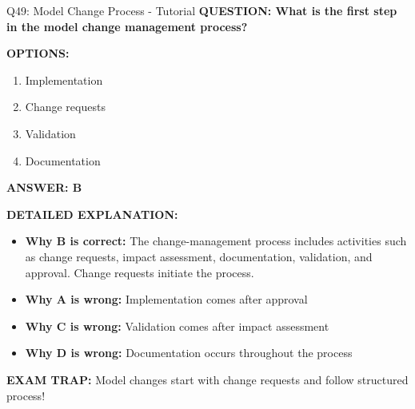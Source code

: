 \documentclass[8pt]{beamer}
\begin{document}
	\begin{frame}{Q49: Model Change Process - Tutorial}
		\fontsize{6.5}{7.5}\selectfont
		\textbf{QUESTION: What is the first step in the model change management process?}
		
		\vspace{0.1cm}
		\textbf{OPTIONS:}
		\begin{enumerate}
			\item Implementation
			\item Change requests
			\item Validation
			\item Documentation
		\end{enumerate}
		
		\vspace{0.1cm}
		\textcolor{myblue}{\textbf{ANSWER: B}}
		
		\vspace{0.1cm}
		\textbf{DETAILED EXPLANATION:}
		\begin{itemize}
			\item \textbf{Why B is correct:} The change-management process includes activities such as change requests, impact assessment, documentation, validation, and approval. Change requests initiate the process.
			\item \textbf{Why A is wrong:} Implementation comes after approval
			\item \textbf{Why C is wrong:} Validation comes after impact assessment
			\item \textbf{Why D is wrong:} Documentation occurs throughout the process
		\end{itemize}
		
		\textcolor{myred}{\textbf{EXAM TRAP:}} Model changes start with \textcolor{myblue}{change requests} and follow structured process!
	\end{frame}
	
\end{document}
